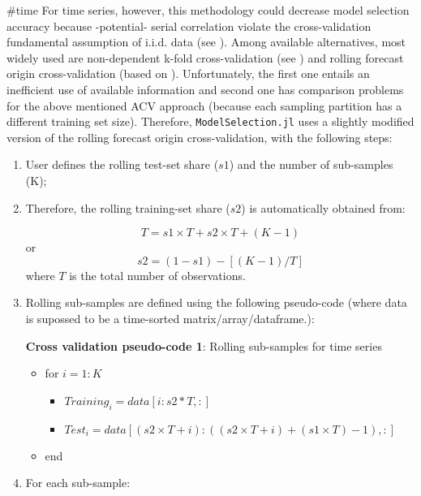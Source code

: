 \documentclass{article}
\begin{document}
{{#time}}
For time series, however, this methodology could decrease model selection accuracy because -potential- serial correlation violate the cross-validation fundamental assumption of i.i.d. data (see \cite{bergmeir2012}). Among available alternatives, most widely used are non-dependent k-fold cross-validation (see \cite{bergmeir2018}) and rolling forecast origin cross-validation (based on \cite{hyndman2013}). Unfortunately, the  first one entails an inefficient use of available information and second one has comparison problems for the above mentioned ACV approach (because each sampling partition has a different training set size). Therefore, \verb|ModelSelection.jl| uses a slightly modified version of the rolling forecast origin cross-validation, with the following steps:


\begin{enumerate}
\item User defines the rolling test-set share ($s1$) and the number of sub-samples (K);
\item Therefore, the rolling training-set share ($s2$) is automatically obtained from:

\begin{equation}
  T=s1 \times T+s2 \times T+(K-1)
\end{equation}
or
\begin{equation}
  s2=(1-s1)-[(K-1)/T]
\end{equation}
where $T$ is the total number of observations.
\item Rolling sub-samples are defined using the following pseudo-code (where data is supossed to be a time-sorted matrix/array/dataframe.):

\begin{algorithm}
\caption*{\textbf{Cross validation pseudo-code 1}: Rolling sub-samples for time series}
\begin{itemize}
  \item[] for $i=1:K$
  \begin{itemize}
    \item[]  $Training_i=data[i:s2*T,:]$
    \item[]  $Test_i=data[(s2 \times T+i):((s2 \times T+i)+(s1 \times T)-1),:]$
  \end{itemize}
  \item[] end
\end{itemize}
\end{algorithm}

\item For each sub-sample:


\end{enumerate}
\end{document}
